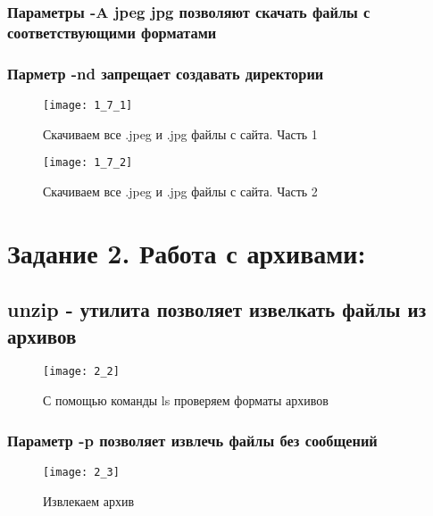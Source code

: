 \subsubsection{Параметры -A jpeg jpg позволяют скачать файлы с соответствующими форматами}
\subsubsection{Парметр -nd запрещает создавать директории}

\begin{figure}[H]
	\begin{center}
		\texttt{[image: 1\_7\_1]}
		\caption{Скачиваем все .jpeg и .jpg файлы с сайта. Часть 1} 
		\label{pic:pic_1} %
	\end{center}
\end{figure}

\begin{figure}[H]
	\begin{center}
		\texttt{[image: 1\_7\_2]}
		\caption{Скачиваем все .jpeg и .jpg файлы с сайта. Часть 2} 
		\label{pic:pic_1} %
	\end{center}
\end{figure}

\newpage

\section{Задание 2. Работа с архивами:}

\subsection{unzip - утилита позволяет извелкать файлы из архивов}

\begin{figure}[H]
	\begin{center}
		\texttt{[image: 2\_2]}
		\caption{С помощью команды ls проверяем форматы архивов} 
		\label{pic:pic_1} %
	\end{center}
\end{figure}

\subsubsection{Параметр -p позволяет извлечь файлы без сообщений}

\begin{figure}[H]
	\begin{center}
		\texttt{[image: 2\_3]}
		\caption{Извлекаем архив} 
		\label{pic:pic_1} %
	\end{center}
\end{figure}

